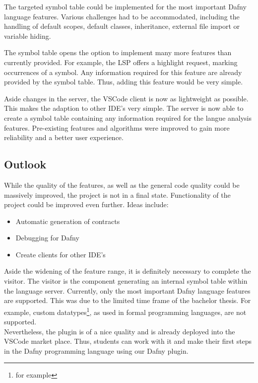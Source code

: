 The targeted symbol table could be implemented for the most important Dafny language features.
Various challenges had to be accommodated, including the handling of default scopes, default classes, inheritance, external file import or variable hiding.

The symbol table opens the option to implement many more features than currently provided.
For example, the LSP offers a highlight request, marking occurrences of a symbol.
Any information required for this feature are already provided by the symbol table.
Thus, adding this feature would be very simple.

Aside changes in the server, the VSCode client is now as lightweight as possible.
This makes the adaption to other IDE's very simple.
The server is now able to create a symbol table containing any information required for the langue analysis features.
Pre-existing features and algorithms were improved to gain more reliability and a better user experience.

\subsection{Outlook}
While the quality of the features, as well as the general code quality could be massively improved, the project is not in a final state.
Functionality of the project could be improved even further.
Ideas include:
\begin{itemize}
    \item Automatic generation of contracts
    \item Debugging for Dafny
    \item Create clients for other IDE's
\end{itemize}

Aside the widening of the feature range, it is definitely necessary to complete the visitor.
The visitor is the component generating an internal symbol table within the language server.
Currently, only the most important Dafny language features are supported.
This was due to the limited time frame of the bachelor thesis.
For example, custom datatypes\footnote{for example }, as used in formal programming languages, are not supported.\\

Nevertheless, the plugin is of a nice quality and is already deployed into the VSCode market place.
Thus, students can work with it and make their first steps in the Dafny programming language using our Dafny plugin.
